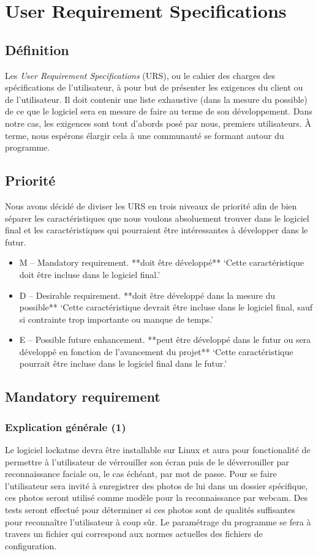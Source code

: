 \chapter{User Requirement Specifications}
\section{Définition}
Les \emph{User Requirement Specifications} (URS), ou le cahier des charges des
spécifications de l’utilisateur, à pour but de présenter les exigences du
client ou de l’utilisateur. Il doit contenir une liste exhaustive
(dans la mesure du possible) de ce que le logiciel sera en mesure de faire au
terme de son développement. Dans notre cas, les exigences sont tout d’abords
posé par nous, premiers utilisateurs. À terme, nous espérons élargir cela à
une communauté se formant autour du programme.

\section{Priorité}
Nous avons décidé de diviser les URS en trois niveaux de priorité afin de bien
séparer les caractéristiques que nous voulons absoluement trouver dans le
logiciel final et les caractéristiques qui pourraient être intéressantes à
développer dans le futur.
\begin{itemize}
  \item{M – Mandatory requirement. **doit être développé**
‘Cette caractéristique doit être incluse dans le logiciel final.’}
  \item{D – Desirable requirement. **doit être développé dans la mesure du
  possible**
‘Cette caractéristique devrait être incluse dans le logiciel final, sauf si
contrainte trop importante ou manque de temps.’}
  \item{E – Possible future enhancement. **peut être développé dans le futur
  ou sera développé en fonction de l’avancement du projet**
‘Cette caractéristique pourrait être incluse dans le logiciel final dans le
futur.’}
\end{itemize}

\section{Mandatory requirement}
  \subsection{Explication générale (1)}
Le logiciel lockatme devra être installable sur Linux et aura pour
fonctionalité de permettre à l’utilisateur de vérrouiller son écran puis de
le déverrouiller par reconnaissance faciale ou, le cas échéant, par mot de
passe. Pour se faire l’utilisateur sera invité à enregistrer des photos de
lui dans un dossier spécifique, ces photos seront utilisé comme modèle pour la
reconnaissance par webcam. Des tests seront effectué pour déterminer si ces
photos sont de qualités suffisantes pour reconnaître l’utilisateur à coup sûr.
Le paramétrage du programme se fera à travers un fichier qui correspond aux
normes actuelles des fichiers de configuration.

